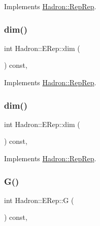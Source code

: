 Implements \mbox{\hyperlink{structHadron_1_1RepRep_a92c8802e5ed7afd7da43ccfd5b7cd92b}{Hadron\+::\+Rep\+Rep}}.

\mbox{\label{structHadron_1_1ERep_a9eba7fc8ee0562900e00c0755337f103}} 
\subsubsection{\texorpdfstring{dim()}{dim()}\hspace{0.1cm}{\footnotesize\ttfamily [2/3]}}
{\footnotesize\ttfamily int Hadron\+::\+E\+Rep\+::dim (\begin{DoxyParamCaption}{ }\end{DoxyParamCaption}) const\hspace{0.3cm}{\ttfamily [inline]}, {\ttfamily [virtual]}}



Implements \mbox{\hyperlink{structHadron_1_1RepRep_a92c8802e5ed7afd7da43ccfd5b7cd92b}{Hadron\+::\+Rep\+Rep}}.

\mbox{\label{structHadron_1_1ERep_a9eba7fc8ee0562900e00c0755337f103}} 
\subsubsection{\texorpdfstring{dim()}{dim()}\hspace{0.1cm}{\footnotesize\ttfamily [3/3]}}
{\footnotesize\ttfamily int Hadron\+::\+E\+Rep\+::dim (\begin{DoxyParamCaption}{ }\end{DoxyParamCaption}) const\hspace{0.3cm}{\ttfamily [inline]}, {\ttfamily [virtual]}}



Implements \mbox{\hyperlink{structHadron_1_1RepRep_a92c8802e5ed7afd7da43ccfd5b7cd92b}{Hadron\+::\+Rep\+Rep}}.

\mbox{\label{structHadron_1_1ERep_afc59abdfb3fdbbcddbe2dede52c570a6}} 
\subsubsection{\texorpdfstring{G()}{G()}\hspace{0.1cm}{\footnotesize\ttfamily [1/2]}}
{\footnotesize\ttfamily int Hadron\+::\+E\+Rep\+::G (\begin{DoxyParamCaption}{ }\end{DoxyParamCaption}) const\hspace{0.3cm}{\ttfamily [inline]}, {\ttfamily [virtual]}}

